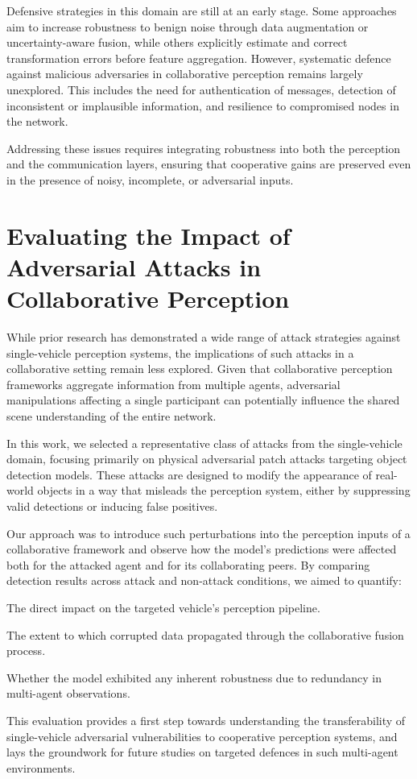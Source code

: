 Defensive strategies in this domain are still at an early stage.
Some approaches aim to increase robustness to benign noise through data augmentation or uncertainty-aware fusion, while others explicitly estimate and correct transformation errors before feature aggregation.
However, systematic defence against malicious adversaries in collaborative perception remains largely unexplored.
This includes the need for authentication of messages, detection of inconsistent or implausible information, and resilience to compromised nodes in the network.

Addressing these issues requires integrating robustness into both the perception and the communication layers, ensuring that cooperative gains are preserved even in the presence of noisy, incomplete, or adversarial inputs.

\section{Evaluating the Impact of Adversarial Attacks in Collaborative Perception}

While prior research has demonstrated a wide range of attack strategies against single-vehicle perception systems, the implications of such attacks in a collaborative setting remain less explored.
Given that collaborative perception frameworks aggregate information from multiple agents, adversarial manipulations affecting a single participant can potentially influence the shared scene understanding of the entire network.

In this work, we selected a representative class of attacks from the single-vehicle domain, focusing primarily on physical adversarial patch attacks targeting object detection models.
These attacks are designed to modify the appearance of real-world objects in a way that misleads the perception system, either by suppressing valid detections or inducing false positives.

Our approach was to introduce such perturbations into the perception inputs of a collaborative framework and observe how the model’s predictions were affected both for the attacked agent and for its collaborating peers.
By comparing detection results across attack and non-attack conditions, we aimed to quantify:

The direct impact on the targeted vehicle’s perception pipeline.

The extent to which corrupted data propagated through the collaborative fusion process.

Whether the model exhibited any inherent robustness due to redundancy in multi-agent observations.

This evaluation provides a first step towards understanding the transferability of single-vehicle adversarial vulnerabilities to cooperative perception systems, and lays the groundwork for future studies on targeted defences in such multi-agent environments.


